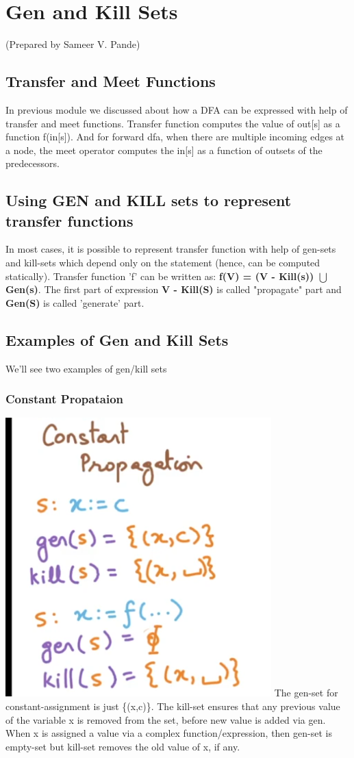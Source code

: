 \section {Gen and Kill Sets}
\setlength{\parindent}{0pt}
(Prepared by Sameer V. Pande)

\subsection{Transfer and Meet Functions}
In previous module we discussed about how a DFA can be expressed with help of transfer and meet functions.
Transfer function computes the value of out[s] as a function f(in[s]). And for forward dfa, when there are multiple incoming edges at a node,
the meet operator computes the in[s] as a function of outsets of the predecessors.

\subsection{Using GEN and KILL sets to represent transfer functions}
In most cases, it is possible to represent transfer function with help of gen-sets and kill-sets which depend only on the statement (hence, can be computed statically).
Transfer function 'f' can be written as: \textbf{f(V) = (V - Kill(s)) $\bigcup$ Gen(s)}. The first part of expression
\textbf{ V - Kill(S)} is called "propagate" part and \textbf{Gen(S)} is called 'generate' part.

\subsection{Examples of Gen and Kill Sets}
We'll see two examples of gen/kill sets 
\subsubsection{Constant Propataion}
\includegraphics[scale=0.5]{images/89_1.png}
\newline 
The gen-set for constant-assignment is just \{(x,c)\}. The kill-set ensures that any previous value of the variable x is removed from the set, before new value is added via gen.
When x is assigned a value via a complex function/expression, then gen-set is empty-set but kill-set removes the old value of x, if any.
